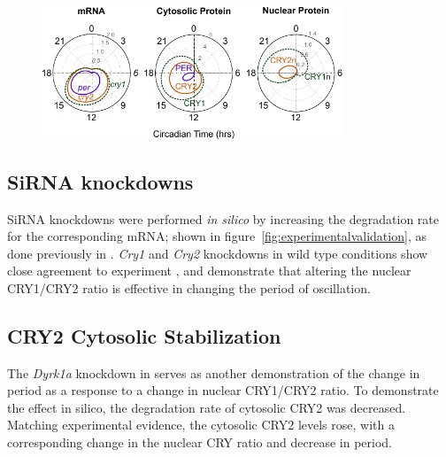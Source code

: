   \begin{figure}[bt]
    \centering
    \begin{minipage}{0.9\textwidth}
      \centering
      \includegraphics[width=0.8\textwidth]{chap2/figures/timecourse.pdf}
      \label{fig:timecourse}
    \end{minipage}
  \end{figure}

  \subsection{SiRNA knockdowns} SiRNA knockdowns were performed {\it in silico} by increasing the degradation rate for the corresponding mRNA; shown in figure~\ref{fig:experimentalvalidation}, as done previously in \cite{Relogio2011}. {\it Cry1} and {\it Cry2} knockdowns in wild type conditions show close agreement to experiment \cite{Zhang2009}, and demonstrate that altering the nuclear CRY1/CRY2 ratio is effective in changing the period of oscillation.

  \subsection{CRY2 Cytosolic Stabilization} The {\it Dyrk1a} knockdown in \cite{Kurabayashi2010} serves as another demonstration of the change in period as a response to a change in nuclear CRY1/CRY2 ratio. To demonstrate the effect in silico, the degradation rate of cytosolic CRY2 was decreased. Matching experimental evidence, the cytosolic CRY2 levels rose, with a corresponding change in the nuclear CRY ratio and decrease in period.

